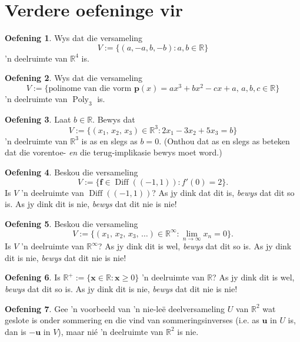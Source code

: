 \documentclass[a4paper,11pt]{book}
\theoremstyle{definition}
\newtheorem{exercise}{Oefening}
\newcommand{\ve}[1]{\mathbf{#1}}
\newcommand{\furtherexercises}{\section*{Verdere oefeninge vir
\thesection}}
\DeclareMathOperator{\Diff}{Diff}
\DeclareMathOperator{\Poly}{Poly}
\begin{document}
\furtherexercises

\begin{exercise} Wys dat die versameling
\[
 V := \{ (a, -a, b, -b) : a, b \in \mathbb{R} \}
\]
'n deelruimte van $\mathbb{R}^4$ is.
\end{exercise}

\begin{exercise} Wys dat die versameling
	\[
		V := \{ \mbox{polinome van die vorm } \ve{p}(x) = ax^3 + bx^2 - cx
		+ a, \, a,b,c \in \mathbb{R}\}
	\]
	'n deelruimte van $\Poly_3$ is.
\end{exercise}

\begin{exercise} Laat $b \in \mathbb{R}$. Bewys dat
	\[
		V := \{ (x_1, \, x_2, \, x_3) \in \mathbb{R}^3 : 2x_1 - 3x_2 + 5x_3
		= b \}
	\]
	'n deelruimte van $\mathbb{R}^3$ is as en slegs as $b=0$. (Onthou dat
	as en slegs as beteken dat die vorentoe- \emph{en} die terug-implikasie
	bewys moet word.)
\end{exercise}

\begin{exercise} Beskou die versameling
	\[
		V := \{ \mathbf{f} \in \Diff((-1, 1)) : f'(0) = 2 \}.
	\]
	Is $V$ 'n deelruimte van $\Diff((-1,1))$? As jy dink dat dit is,
	\emph{bewys} dat dit so is. As jy dink dit is nie, \emph{bewys} dat dit
	nie is nie!
\end{exercise}

\begin{exercise} Beskou die versameling
	\[
		V := \{ (x_1, \, x_2, \, x_3, \, \ldots) \in \mathbb{R}^\infty :
	\lim_{n \rightarrow \infty} x_n = 0 \}.
	\]
	Is $V$ 'n deelruimte van $\mathbb{R}^\infty$? As jy dink dit is wel,
	\emph{bewys} dat dit so is. As jy dink dit is nie, \emph{bewys} dat dit
	nie is nie!
\end{exercise}

\begin{exercise} Is $\mathbb{R}^+ := \{ \ve{x} \in \mathbb{R} : \ve{x} \geq
	0 \}$ 'n deelruimte van $\mathbb{R}$? As jy dink dit is wel,
	\emph{bewys} dat dit so is. As jy dink dit is nie, \emph{bewys} dat dit
	nie is nie!
\end{exercise}

\begin{exercise} Gee 'n voorbeeld van 'n nie-le{\"e} deelversameling $U$
	van $\mathbb{R}^2$ wat geslote is onder sommering en die vind van
	sommeringsinverses (i.e. as $\ve{u}$ in $U$ is, dan is $-\ve{u}$ in
	$V$), maar nié 'n deelruimte van $\mathbb{R}^2$ is nie.
\end{exercise}
\end{document}
